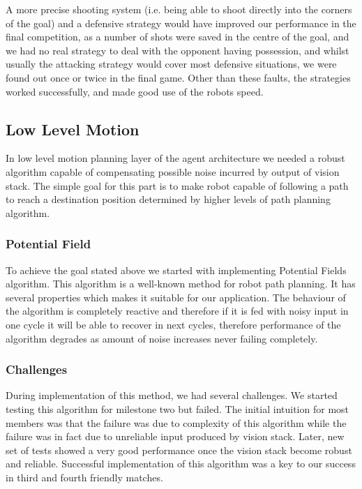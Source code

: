A more precise shooting system (i.e. being able to shoot directly into the corners of the goal) and a defensive strategy would have improved our performance in the final competition, as a number of shots were saved in the centre of the goal, and we had no real strategy to deal with the opponent having possession, and whilst usually the attacking strategy would cover most defensive situations, we were found out once or twice in the final game. Other than these faults, the strategies worked successfully, and made good use of the robots speed.

\subsection{Low Level Motion}
In low level motion planning layer of the agent architecture we needed a robust algorithm capable of compensating possible noise incurred by output of vision stack.  The simple goal for this part is to make robot capable of following a path to reach a destination position determined by higher levels of path planning algorithm.\linebreak

\subsubsection{Potential Field}
To achieve the goal stated above we started with implementing Potential Fields\cite{paper:PF} algorithm. This algorithm is a well-known method for robot path planning. It has several properties which makes it suitable for our application. The behaviour of the algorithm is completely reactive and therefore if it is fed with noisy input in one cycle it will be able to recover in next cycles, therefore performance of the algorithm degrades as amount of noise increases never failing completely.\linebreak

\subsubsection{Challenges}
During implementation of this method, we had several challenges. We started testing this algorithm for milestone two but failed. The initial intuition for most members was that the failure was due to complexity of this algorithm while the failure was in fact due to unreliable input produced by vision stack. Later, new set of tests showed a very good performance once the vision stack become robust and reliable. Successful implementation of this algorithm was a key to our success in third and fourth friendly matches.\linebreak

